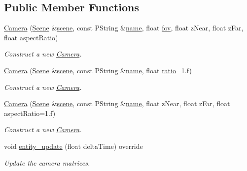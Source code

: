 \subsection*{Public Member Functions}
\begin{DoxyCompactItemize}
\item 
\mbox{\hyperlink{classprz_1_1_camera_a6464fdd8ca4f4f3f02d7b368f7398b4f}{Camera}} (\mbox{\hyperlink{classprz_1_1_scene}{Scene}} \&\mbox{\hyperlink{classprz_1_1_entity_abc93c872fbda2dff6c205a8aeac9d96e}{scene}}, const P\+String \&\mbox{\hyperlink{classprz_1_1_entity_a3dcb8ce07126711bf90f3272b293d980}{name}}, float \mbox{\hyperlink{classprz_1_1_camera_a1424858488672135d41e1376c7c0db11}{fov}}, float z\+Near, float z\+Far, float aspect\+Ratio)
\begin{DoxyCompactList}\small\item\em Construct a new \mbox{\hyperlink{classprz_1_1_camera}{Camera}}. \end{DoxyCompactList}\item 
\mbox{\hyperlink{classprz_1_1_camera_a7e8a661cdd1e01103456b25f45dc1a62}{Camera}} (\mbox{\hyperlink{classprz_1_1_scene}{Scene}} \&\mbox{\hyperlink{classprz_1_1_entity_abc93c872fbda2dff6c205a8aeac9d96e}{scene}}, const P\+String \&\mbox{\hyperlink{classprz_1_1_entity_a3dcb8ce07126711bf90f3272b293d980}{name}}, float \mbox{\hyperlink{classprz_1_1_camera_a517dfb210de1064c5f13435bff78af6f}{ratio}}=1.f)
\begin{DoxyCompactList}\small\item\em Construct a new \mbox{\hyperlink{classprz_1_1_camera}{Camera}}. \end{DoxyCompactList}\item 
\mbox{\hyperlink{classprz_1_1_camera_a5e9296273a259cd0876378c89ad4bfea}{Camera}} (\mbox{\hyperlink{classprz_1_1_scene}{Scene}} \&\mbox{\hyperlink{classprz_1_1_entity_abc93c872fbda2dff6c205a8aeac9d96e}{scene}}, const P\+String \&\mbox{\hyperlink{classprz_1_1_entity_a3dcb8ce07126711bf90f3272b293d980}{name}}, float z\+Near, float z\+Far, float aspect\+Ratio=1.f)
\begin{DoxyCompactList}\small\item\em Construct a new \mbox{\hyperlink{classprz_1_1_camera}{Camera}}. \end{DoxyCompactList}\item 
void \mbox{\hyperlink{classprz_1_1_camera_abea73c7221f27991b3c2790e71feaf3b}{entity\+\_\+update}} (float delta\+Time) override
\begin{DoxyCompactList}\small\item\em Update the camera matrices. \end{DoxyCompactList}\item 

\end{DoxyCompactItemize}
